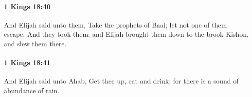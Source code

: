 		\paragraph{1 Kings 18:40} %
			\label{1KINGS-18-40}

			And Elijah said unto them, Take the prophets of Baal; let not one of them escape. And they took them: and Elijah brought them down to the brook Kishon, and slew them there.


		\paragraph{1 Kings 18:41} %
			\label{1KINGS-18-41}

			And Elijah said unto Ahab, Get thee up, eat and drink; for there is a sound of abundance of rain.


